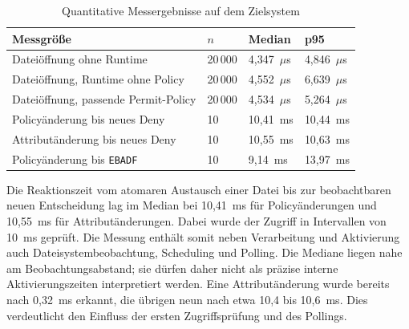 \begin{table}[htbp]
    \centering
    \begin{tabular}{p{}p{}p{}p{}}
        \hline
        \textbf{Messgröße} & \textbf{$n$} & \textbf{Median} & \textbf{p95} \\
        \hline
        Dateiöffnung ohne Runtime & 20\,000 & 4,347~$\mu$s & 4,846~$\mu$s \\
        Dateiöffnung, Runtime ohne Policy & 20\,000 & 4,552~$\mu$s & 6,639~$\mu$s \\
        Dateiöffnung, passende Permit-Policy & 20\,000 & 4,534~$\mu$s & 5,264~$\mu$s \\
        Policyänderung bis neues Deny & 10 & 10,41~ms & 10,44~ms \\
        Attributänderung bis neues Deny & 10 & 10,55~ms & 10,63~ms \\
        Policyänderung bis \texttt{EBADF} & 10 & 9,14~ms & 13,97~ms \\
        \hline
    \end{tabular}
    \caption{Quantitative Messergebnisse auf dem Zielsystem}
    \label{tab:performance-ergebnisse}
\end{table}

Die Reaktionszeit vom atomaren Austausch einer Datei bis zur beobachtbaren neuen Entscheidung
lag im Median bei 10,41~ms für Policyänderungen und 10,55~ms für Attributänderungen. Dabei wurde
der Zugriff in Intervallen von 10~ms geprüft. Die Messung enthält somit neben Verarbeitung und
Aktivierung auch Dateisystembeobachtung, Scheduling und Polling. Die Mediane liegen nahe
am Beobachtungsabstand; sie dürfen daher nicht als präzise interne Aktivierungszeiten interpretiert
werden. Eine Attributänderung wurde bereits nach 0,32~ms erkannt, die übrigen neun nach etwa
10,4 bis 10,6~ms. Dies verdeutlicht den Einfluss der ersten Zugriffsprüfung und des Pollings.

